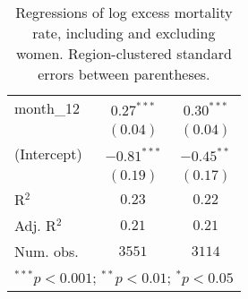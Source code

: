 \begin{table}[h!]
\begin{center}
\begin{small}
\begin{tabular}{l c c}
month\_12      & $0.27^{***}$  & $0.30^{***}$  \\
               & $(0.04)$      & $(0.04)$      \\
(Intercept)    & $-0.81^{***}$ & $-0.45^{**}$  \\
               & $(0.19)$      & $(0.17)$      \\
\hline
R$^2$          & $0.23$        & $0.22$        \\
Adj. R$^2$     & $0.21$        & $0.21$        \\
Num. obs.      & $3551$        & $3114$        \\
\hline
\multicolumn{3}{l}{\tiny{$^{***}p<0.001$; $^{**}p<0.01$; $^{*}p<0.05$}}
\end{tabular}
\end{small}
\caption{Regressions of log excess mortality rate, including and excluding women. Region-clustered standard errors between parentheses.}
\label{tab:nofemmodels}
\end{center}
\end{table}
